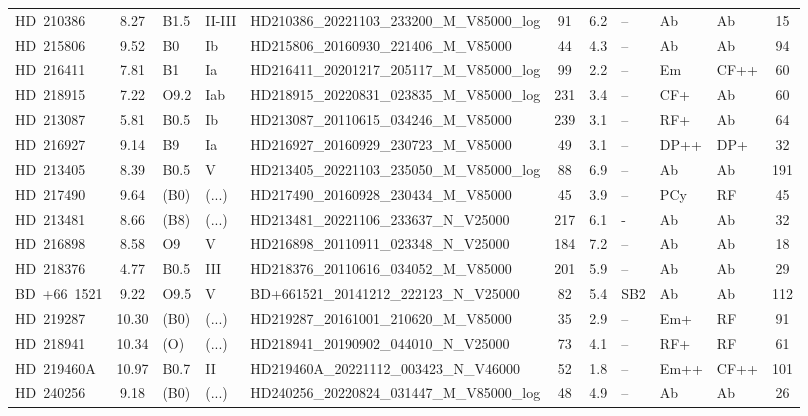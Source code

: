 {\begin{landscape}
\begin{longtable}{lclllcclllc}
\noalign{\smallskip}
HD~210386 & 8.27 & B1.5 & II-III & HD210386\_20221103\_233200\_M\_V85000\_log & 91 & 6.2 & -- & Ab & Ab & 15 \\
\noalign{\smallskip}
HD~215806 & 9.52 & B0 & Ib & HD215806\_20160930\_221406\_M\_V85000 & 44 & 4.3 & -- & Ab & Ab & 94 \\
\noalign{\smallskip}
HD~216411 & 7.81 & B1 & Ia & HD216411\_20201217\_205117\_M\_V85000\_log & 99 & 2.2 & -- & Em & CF++ & 60 \\
\noalign{\smallskip}
HD~218915 & 7.22 & O9.2 & Iab & HD218915\_20220831\_023835\_M\_V85000\_log & 231 & 3.4 & -- & CF+ & Ab & 60 \\
\noalign{\smallskip}
HD~213087 & 5.81 & B0.5 & Ib & HD213087\_20110615\_034246\_M\_V85000 & 239 & 3.1 & -- & RF+ & Ab & 64 \\
\noalign{\smallskip}
HD~216927 & 9.14 & B9 & Ia & HD216927\_20160929\_230723\_M\_V85000 & 49 & 3.1 & -- & DP++ & DP+ & 32 \\
\noalign{\smallskip}
HD~213405 & 8.39 & B0.5 & V & HD213405\_20221103\_235050\_M\_V85000\_log & 88 & 6.9 & -- & Ab & Ab & 191 \\
\noalign{\smallskip}
HD~217490 & 9.64 & (B0) & (...) & HD217490\_20160928\_230434\_M\_V85000 & 45 & 3.9 & -- & PCy & RF & 45 \\
\noalign{\smallskip}
HD~213481 & 8.66 & (B8) & (...) & HD213481\_20221106\_233637\_N\_V25000 & 217 & 6.1 & - & Ab & Ab & 32 \\
\noalign{\smallskip}
HD~216898 & 8.58 & O9 & V & HD216898\_20110911\_023348\_N\_V25000 & 184 & 7.2 & -- & Ab & Ab & 18 \\
\noalign{\smallskip}
HD~218376 & 4.77 & B0.5 & III & HD218376\_20110616\_034052\_M\_V85000 & 201 & 5.9 & -- & Ab & Ab & 29 \\
\noalign{\smallskip}
BD~+66~1521 & 9.22 & O9.5 & V & BD+661521\_20141212\_222123\_N\_V25000 & 82 & 5.4 & SB2 & Ab & Ab & 112 \\
\noalign{\smallskip}
HD~219287 & 10.30 & (B0) & (...) & HD219287\_20161001\_210620\_M\_V85000 & 35 & 2.9 & -- & Em+ & RF & 91 \\
\noalign{\smallskip}
HD~218941 & 10.34 & (O) & (...) & HD218941\_20190902\_044010\_N\_V25000 & 73 & 4.1 & -- & RF+ & RF & 61 \\
\noalign{\smallskip}
HD~219460A & 10.97 & B0.7 & II & HD219460A\_20221112\_003423\_N\_V46000 & 52 & 1.8 & -- & Em++ & CF++ & 101 \\
\noalign{\smallskip}
HD~240256 & 9.18 & (B0) & (...) & HD240256\_20220824\_031447\_M\_V85000\_log & 48 & 4.9 & -- & Ab & Ab & 26 \\

\end{longtable}
\end{landscape}}
